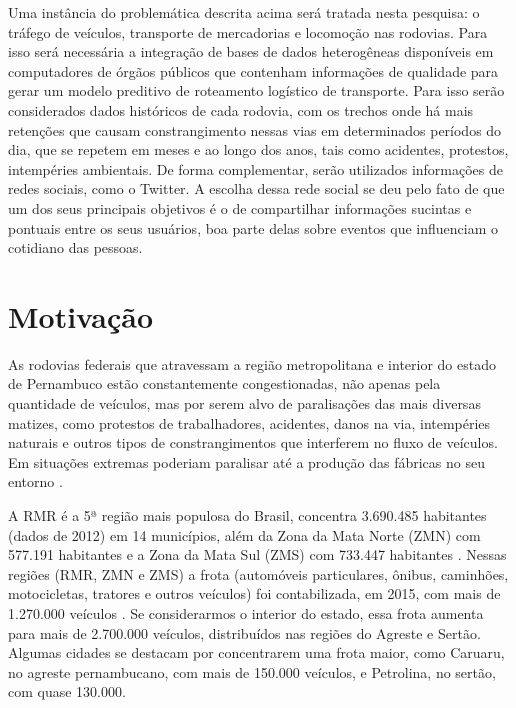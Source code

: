 Uma instância do problemática descrita acima será tratada nesta pesquisa: o tráfego de veículos, transporte de mercadorias e locomoção nas rodovias.  Para isso será necessária a integração de bases de dados heterogêneas disponíveis em computadores de órgãos públicos 
que contenham informações de qualidade para gerar um modelo preditivo de roteamento logístico de transporte. Para isso serão considerados dados históricos de cada rodovia, com os trechos onde há mais 
retenções que causam constrangimento nessas vias em determinados períodos do dia, que se repetem em meses e ao longo dos anos, tais como acidentes, protestos, intempéries ambientais.
De forma complementar, serão utilizados informações de redes sociais, como o Twitter. A escolha dessa rede social se deu pelo fato de que um dos seus principais objetivos é o de compartilhar informações sucintas e pontuais entre os seus usuários, boa parte delas sobre eventos que influenciam o cotidiano das pessoas.



\section{ Motivação}\label{intro:motivacao}

As rodovias federais que atravessam a região metropolitana e interior do estado de Pernambuco estão constantemente congestionadas, não apenas pela 
quantidade de veículos, mas por serem alvo de paralisações das mais diversas matizes, como protestos de trabalhadores, acidentes, danos na via, intempéries naturais e outros tipos de constrangimentos que interferem no fluxo de veículos. 
Em situações extremas poderiam paralisar até a produção das fábricas no seu entorno \cite{BNDES2013}. 

A RMR é a 5ª região mais populosa do Brasil, concentra 3.690.485 habitantes (dados de 2012) em 14 municípios, além da 
Zona da Mata Norte (ZMN) com 577.191 habitantes e a Zona da Mata Sul (ZMS) com 733.447 habitantes \cite{Bitoun2012}. 
Nessas regiões (RMR, ZMN e ZMS) a frota (automóveis particulares, ônibus, caminhões, motocicletas, tratores e outros veículos) 
foi contabilizada, em 2015, com mais de 1.270.000 veículos \cite{FrotaVeiculosIBGE}. Se considerarmos o interior do estado, essa frota aumenta para mais de 2.700.000 veículos, distribuídos nas regiões do Agreste e Sertão. Algumas cidades se destacam por concentrarem uma frota maior, como Caruaru, no agreste pernambucano, com mais de 150.000 veículos, e Petrolina, no sertão, com quase 130.000. 
																			
